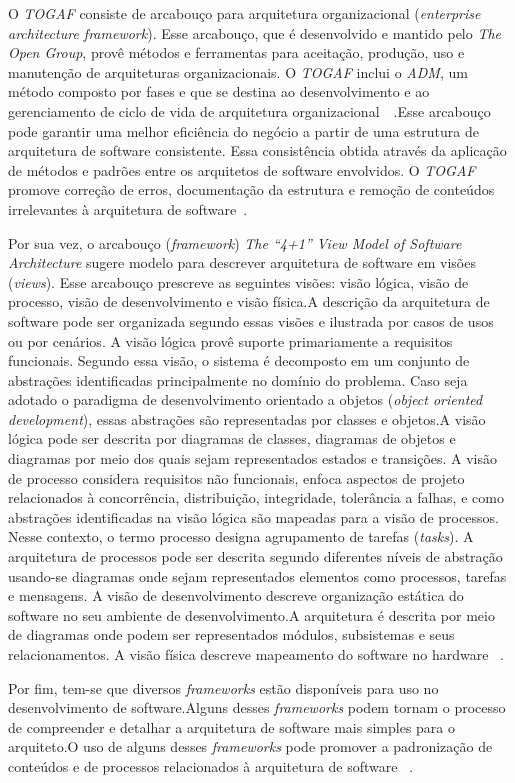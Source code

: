 O \emph{\acrfull{TOGAF}} consiste de arcabouço para arquitetura organizacional (\emph{enterprise architecture framework}). Esse arcabouço, que é desenvolvido e mantido pelo \emph{The Open Group}, provê métodos e ferramentas para aceitação, produção, uso e manutenção de arquiteturas organizacionais. O \emph{\acrfull{TOGAF}} inclui o \emph{\acrfull{ADM}}, um método composto por fases e que se destina ao desenvolvimento e ao gerenciamento de ciclo de vida de arquitetura organizacional~\cite{ISO_42010}~\cite{Togaf}.Esse arcabouço  pode garantir uma melhor eficiência do negócio a partir de uma estrutura de arquitetura de software consistente. Essa consistência obtida através da aplicação de métodos e padrões entre os arquitetos de software envolvidos. O \emph{\acrfull{TOGAF}} promove correção de erros, documentação da estrutura e remoção de conteúdos irrelevantes à arquitetura de software~\cite{Togaf}.

Por sua vez, o arcabouço (\emph{framework}) \emph{The “4+1” View Model of Software Architecture} sugere modelo para descrever arquitetura de software em visões (\emph{views}). 
Esse arcabouço prescreve as seguintes visões: visão lógica, visão de processo, visão de desenvolvimento e visão física.A descrição da arquitetura de software pode ser organizada segundo essas visões e ilustrada por casos de usos ou por cenários.
A visão lógica provê suporte primariamente a requisitos funcionais. Segundo essa visão, o sistema é decomposto em um conjunto de abstrações identificadas principalmente no domínio do problema. Caso seja adotado o paradigma de desenvolvimento orientado a objetos (\emph{object oriented development}), essas abstrações são representadas por classes e objetos.A visão lógica pode ser descrita por diagramas de classes, diagramas de objetos e diagramas por meio dos quais sejam representados estados e transições.
A visão de processo considera requisitos não funcionais, enfoca aspectos de projeto relacionados à concorrência, distribuição, integridade, tolerância a falhas, e como abstrações identificadas na visão lógica são mapeadas para a visão de processos. Nesse contexto, o termo processo designa agrupamento de tarefas (\emph{tasks}).
A arquitetura de processos pode ser descrita segundo diferentes níveis de abstração usando-se diagramas onde sejam representados elementos como processos, tarefas e mensagens.
A visão de desenvolvimento descreve organização estática do software no seu ambiente de desenvolvimento.A arquitetura é descrita por meio de diagramas onde podem ser representados módulos, subsistemas e seus relacionamentos.
A visão física descreve mapeamento do software no hardware ~\cite{4plus1}. 

Por fim, tem-se que diversos \emph{frameworks} estão disponíveis para uso no desenvolvimento de software.Alguns desses \emph{frameworks}  podem tornam o processo de compreender e detalhar a arquitetura de software mais simples para o arquiteto.O uso de alguns desses \emph{frameworks} pode promover a padronização de conteúdos e de processos relacionados à arquitetura de software ~\cite{ISO_42010}.
